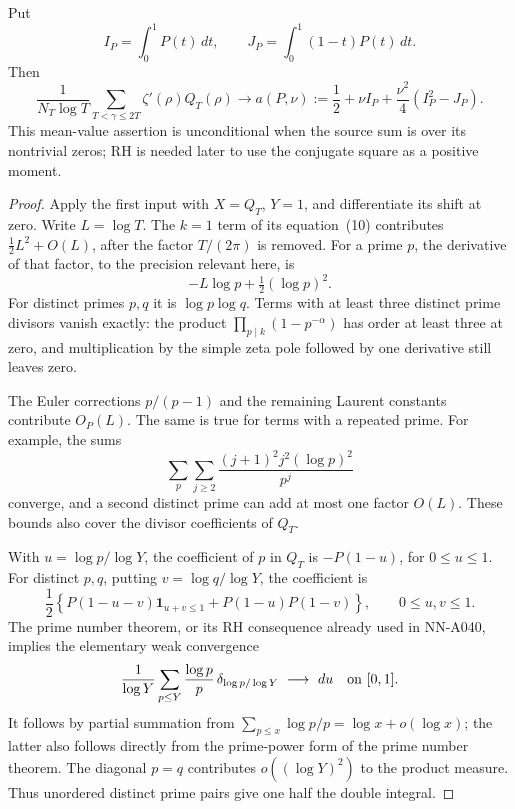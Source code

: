 \begin{lemma}
\label{lem:A047-first}
Put
\[
 I_P=\int_0^1P(t)\,dt,\qquad
 J_P=\int_0^1(1-t)P(t)\,dt .
\]
Then
\begin{equation}\label{eq:A047-first-constant}
 \frac1{N_T\log T}\sum_{T<\gamma\le2T}
                       \zeta'(\rho)Q_T(\rho)
       \longrightarrow
 a(P,\nu):=\frac12+\nu I_P+
                           \frac{\nu^2}{4}(I_P^2-J_P).
\end{equation}
This mean-value assertion is unconditional when the source
sum is over its nontrivial zeros; RH is needed later to use
the conjugate square as a positive moment.
\end{lemma}

\begin{proof}
Apply the first input with \(X=Q_T\), \(Y=1\), and
differentiate its shift at zero.  Write \(L=\log T\).
The \(k=1\) term of its equation~(10) contributes
\(\frac12 L^2+O(L)\), after the factor \(T/(2\pi)\)
is removed.  For a prime \(p\), the derivative of that
factor, to the precision relevant here, is
\[
                  -L\log p+\tfrac12(\log p)^2.
\]
For distinct primes \(p,q\) it is
\(\log p\log q\).  Terms with at least three distinct
prime divisors vanish exactly: the product
\(\prod_{p\mid k}(1-p^{-\alpha})\) has order at least
three at zero, and multiplication by the simple zeta
pole followed by one derivative still leaves zero.

The Euler corrections \(p/(p-1)\) and the remaining
Laurent constants contribute \(O_P(L)\).  The same is
true for terms with a repeated prime.  For example,
the sums
\[
 \sum_{p}\sum_{j\ge2}
         \frac{(j+1)^2j^2(\log p)^2}{p^j}
\]
converge, and a second distinct prime can add at most
one factor \(O(L)\).  These bounds also cover the
divisor coefficients of \(Q_T\).

With \(u=\log p/\log Y\), the coefficient of \(p\) in
\(Q_T\) is \(-P(1-u)\), for \(0\le u\le1\).
For distinct \(p,q\), putting \(v=\log q/\log Y\),
the coefficient is
\[
 \frac12\left\{
 P(1-u-v)\mathbf1_{u+v\le1}
                   +P(1-u)P(1-v)\right\},
 \qquad 0\le u,v\le1.
\]
The prime number theorem, or its RH consequence already
used in NN-A040, implies the elementary weak convergence
\[
 \frac1{\log Y}\sum_{p\le Y}
          \frac{\log p}{p}\,\delta_{\log p/\log Y}
                         \ \longrightarrow\ du
                    \quad\hbox{on }[0,1].
\]
It follows by partial summation from
\(\sum_{p\le x}\log p/p=\log x+o(\log x)\); the latter also
follows directly from the prime-power form of the prime
number theorem.  The diagonal \(p=q\) contributes
\(o((\log Y)^2)\) to the product measure.  Thus unordered
distinct prime pairs give one half the double integral.


\end{proof}
